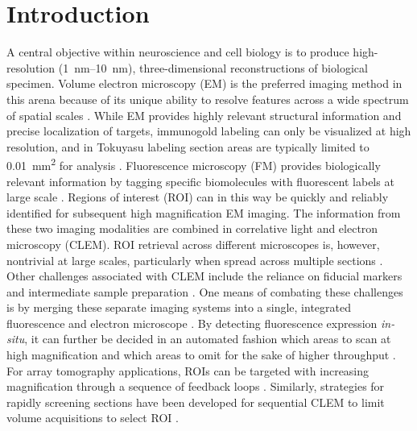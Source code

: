 \section{Introduction}
\label{sec:3.1_intro}

A central objective within neuroscience and cell biology is to produce high-resolution (\SIrange{1}{10}{\nano\meter}), three-dimensional reconstructions of biological specimen. Volume electron microscopy (EM) is the preferred imaging method in this arena because of its unique ability to resolve features across a wide spectrum of spatial scales \cite{peddie2014exploring, kornfeld2018progress}. While EM provides highly relevant structural information and precise localization of targets, immunogold labeling can only be visualized at high resolution, and in Tokuyasu labeling section areas are typically limited to \SI{0.01}{\milli\meter^2} for analysis \cite{liou1996improving, van2008correlative}. Fluorescence microscopy (FM) provides biologically relevant information by tagging specific biomolecules with fluorescent labels at large scale \cite{giepmans2006fluorescent}. Regions of interest (ROI) can in this way be quickly and reliably identified for subsequent high magnification EM imaging. The information from these two imaging modalities are combined in correlative light and electron microscopy (CLEM). ROI retrieval across different microscopes is, however, nontrivial at large scales, particularly when spread across multiple sections \cite{polishchuk2000correlative, bishop2011near, karreman2014correlating, collinson2017correlating, booth2019superclem}. Other challenges associated with CLEM include the reliance on fiducial markers and intermediate sample preparation \cite{de2015correlated, karreman2016intravital}. One means of combating these challenges is by merging these separate imaging systems into a single, integrated fluorescence and electron microscope \cite{liv2013simultaneous}. By detecting fluorescence expression \textit{in-situ}, it can further be decided in an automated fashion which areas to scan at high magnification and which areas to omit for the sake of higher throughput \cite{delpiano2018automated}. For array tomography applications, ROIs can be targeted with increasing magnification through a sequence of feedback loops \cite{gabarre2021workflow}. Similarly, strategies for rapidly screening sections have been developed for sequential CLEM to limit volume acquisitions to select ROI \cite{burel2018targeted, ronchi2021high}.

